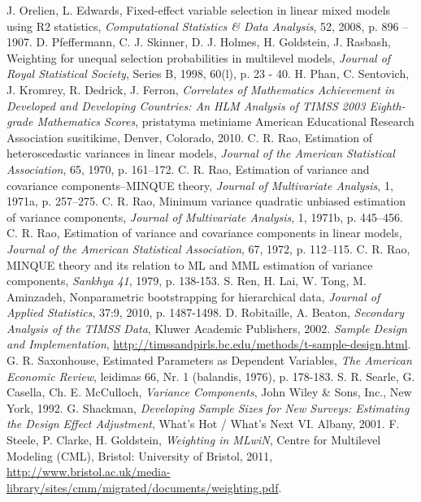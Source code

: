 \documentclass[11pt,a4paper]{article}
\begin{document}
\begin{thebibliography}{1}
 J. Orelien,  L. Edwards, Fixed-effect variable selection in linear mixed models using R2 statistics, \textit{Computational Statistics \& Data Analysis}, 52, 2008, p. 896 – 1907.
D. Pfeffermann, C. J. Skinner, D. J. Holmes, H. Goldstein, J. Rasbash, Weighting for unequal selection probabilities in multilevel models, \textit{Journal of Royal Statistical Society}, Series B, 1998, 60(l), p. 23 - 40.
 H. Phan, C. Sentovich, J. Kromrey, R. Dedrick, J. Ferron, \textit{Correlates of Mathematics Achievement in Developed and Developing Countries: An HLM Analysis of TIMSS 2003 Eighth-grade Mathematics Scores}, pristatyma metiniame American Educational Research Association susitikime, Denver, Colorado, 2010.
C. R. Rao, Estimation of heteroscedastic variances in linear models, \textit{Journal of the American Statistical Association}, 65, 1970, p. 161–172.
 C. R. Rao, Estimation of variance and covariance components–MINQUE theory, \textit{Journal of Multivariate Analysis}, 1, 1971a, p. 257–275.
 C. R. Rao, Minimum variance quadratic unbiased estimation of variance components, \textit{Journal of Multivariate Analysis}, 1, 1971b, p. 445–456.
C. R. Rao, Estimation of variance and covariance components in linear models, \textit{Journal of the American Statistical Association}, 67, 1972, p. 112–115.
 C. R. Rao, MINQUE theory and its relation to ML and MML estimation of variance components, \textit{Sankhya 41}, 1979, p. 138-153.
 S. Ren, H. Lai, W. Tong, M. Aminzadeh, Nonparametric bootstrapping for hierarchical data, \textit{Journal of Applied Statistics}, 37:9, 2010, p. 1487-1498.
 D. Robitaille, A. Beaton, \textit{Secondary Analysis of the TIMSS Data}, Kluwer Academic Publishers, 2002.
 \textit{Sample Design and Implementation}, \href{http://timssandpirls.bc.edu/methods/t-sample-design.html}{http://timssandpirls.bc.edu/methods/t-sample-design.html}.
 G. R. Saxonhouse, Estimated Parameters as Dependent Variables, \textit{The American Economic Review},
leidimas 66, Nr. 1 (balandis, 1976), p. 178-183.
 S. R. Searle, G. Casella, Ch. E. McCulloch, \textit{Variance Components}, John Wiley \& Sons, Inc., New York, 1992.
 G. Shackman, \textit{Developing Sample Sizes for New Surveys: Estimating the Design Effect Adjustment}, What’s Hot / What’s Next VI. Albany, 2001.
 F. Steele, P. Clarke, H. Goldstein, \textit{Weighting in MLwiN}, Centre for Multilevel Modeling (CML), Bristol: University of Bristol, 2011, \href{http://www.bristol.ac.uk/media-library/sites/cmm/migrated/documents/weighting.pdf}{http://www.bristol.ac.uk/media-library/sites/cmm/migrated/documents/weighting.pdf}.

\end{thebibliography}
\end{document}
